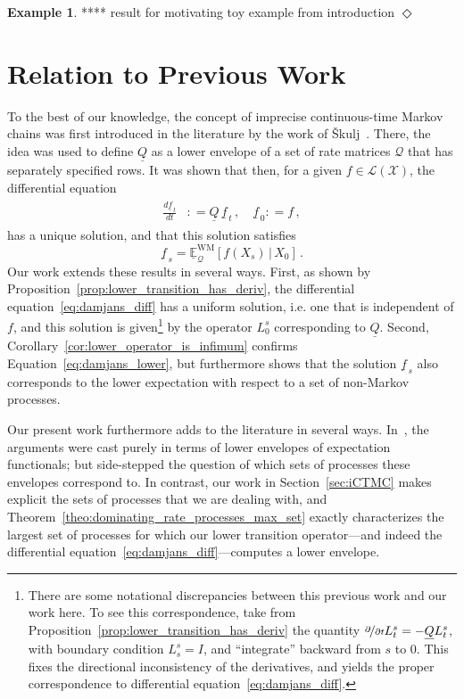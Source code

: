 \documentclass[10pt]{paper}
\theoremstyle{definition}
\newtheorem{exmp}{Example}%
\newcommand{\states}{\mathcal{X}}
\newcommand{\gambles}{\mathcal{L}}
\newcommand{\gamblesX}{\gambles(\states)}
\newcommand{\rateset}{\mathcal{Q}}
\newcommand{\lrate}{\underline{Q}}
\newcommand{\coloneqq}{:\!=}
\newcommand{\exampleend}{\hfill$\Diamond$}
\begin{document}
\begin{exmp}
**** result for motivating toy example from introduction
\exampleend
\end{exmp}

\section{Relation to Previous Work}\label{sec:prev_work}

To the best of our knowledge, the concept of imprecise continuous-time Markov chains was first introduced in the literature by the work of {\v{S}}kulj~\cite{Skulj:2015cq}. There, the idea was used to define $\lrate$ as a lower envelope of a set of rate matrices $\rateset$ that has separately specified rows. It was shown that then, for a given $f\in\gamblesX$, the differential equation
\begin{align}\label{eq:damjans_diff}
\begin{split}
\frac{d \underline{f}_{\,t}}{d t} &\coloneqq \lrate\,\underline{f}_{\,t}\,,\quad
\underline{f}_{\,0} \coloneqq f\,,
\end{split}
\end{align}
has a unique solution, and that this solution satisfies
\begin{equation}\label{eq:damjans_lower}
\underline{f}_{\,s} = \underline{\mathbb{E}}_{\rateset}^{\mathrm{WM}}[f(X_s)\,\vert\,X_0]\,.
\end{equation}
Our work extends these results in several ways. First, as shown by Proposition~\ref{prop:lower_transition_has_deriv}, the differential equation~\eqref{eq:damjans_diff} has a uniform solution, i.e. one that is independent of $f$, and this solution is given\footnote{There are some notational discrepancies between this previous work and our work here. To see this correspondence, take from Proposition~\ref{prop:lower_transition_has_deriv} the quantity $\nicefrac{\partial}{\partial t}L_t^s=-\lrate L_t^s$, with boundary condition $L_s^s=I$, and ``integrate'' backward from $s$ to $0$. This fixes the directional inconsistency of the derivatives, and yields the proper correspondence to differential equation~\eqref{eq:damjans_diff}.} by the operator $L_0^s$ corresponding to $\lrate$. Second, Corollary~\ref{cor:lower_operator_is_infimum} confirms Equation~\eqref{eq:damjans_lower}, but furthermore shows that the solution $\underline{f}_{\,s}$ also corresponds to the lower expectation with respect to a set of non-Markov processes.

Our present work furthermore adds to the literature in several ways. In~\cite{Skulj:2015cq}, the arguments were cast purely in terms of lower envelopes of expectation functionals; but side-stepped the question of which sets of processes these envelopes correspond to. In contrast, our work in Section~\ref{sec:iCTMC} makes explicit the sets of processes that we are dealing with, and Theorem~\ref{theo:dominating_rate_processes_max_set} exactly characterizes the largest set of processes for which our lower transition operator---and indeed the differential equation~\eqref{eq:damjans_diff}---computes a lower envelope.
\end{document}
